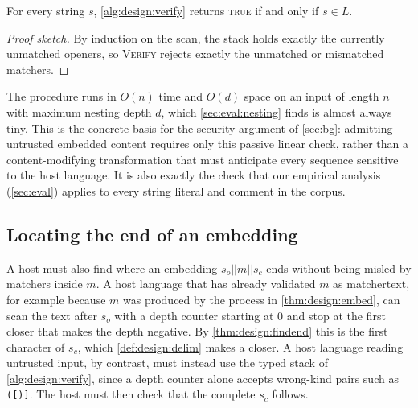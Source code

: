 \begin{theorem}
\label{thm:design:verify}
For every string $s$,
\cref{alg:design:verify} returns \textsc{true} if and only if $s \in L$.
\end{theorem}

\begin{proof}[Proof sketch]
By induction on the scan, the stack holds exactly the currently unmatched openers,
so \textsc{Verify} rejects exactly the unmatched or mismatched matchers.
\end{proof}

The procedure runs in $O(n)$ time and $O(d)$ space
on an input of length $n$ with maximum nesting depth $d$,
which \cref{sec:eval:nesting} finds is almost always tiny.
This is the concrete basis for the security argument of \cref{sec:bg}:
admitting untrusted embedded content requires only this passive linear check,
rather than a content-modifying transformation
that must anticipate every sequence sensitive to the host language.
It is also exactly the check that our empirical analysis (\cref{sec:eval})
applies to every string literal and comment in the corpus.

\subsection{Locating the end of an embedding}
\label{app:formal:findend}

A host must also find where an embedding $s_o||m||s_c$ ends
without being misled by matchers inside $m$.
A host language that has already validated $m$ as matchertext,
for example because $m$ was produced by
the process in \cref{thm:design:embed},
can scan the text after $s_o$ with a depth counter starting at $0$
and stop at the first closer that makes the depth negative.
By \cref{thm:design:findend} this is the first character of $s_c$,
which \cref{def:design:delim} makes a closer.
A host language reading untrusted input, by contrast,
must instead use the typed stack of
\cref{alg:design:verify},
since a depth counter alone accepts wrong-kind pairs such as \verb|([)]|.
The host must then check that the complete $s_c$ follows.
